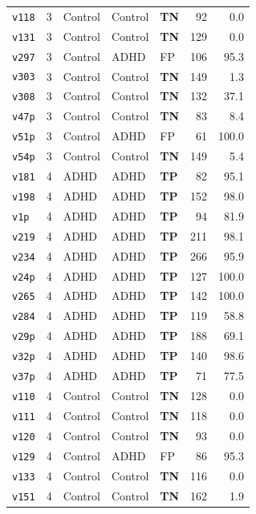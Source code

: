 \begin{longtable}{lclllrr}
  \texttt{v118} & 3 & Control & Control & \textbf{TN} & 92 & 0.0 \\
  \texttt{v131} & 3 & Control & Control & \textbf{TN} & 129 & 0.0 \\
  \texttt{v297} & 3 & Control & ADHD & FP & 106 & 95.3 \\
  \texttt{v303} & 3 & Control & Control & \textbf{TN} & 149 & 1.3 \\
  \texttt{v308} & 3 & Control & Control & \textbf{TN} & 132 & 37.1 \\
  \texttt{v47p} & 3 & Control & Control & \textbf{TN} & 83 & 8.4 \\
  \texttt{v51p} & 3 & Control & ADHD & FP & 61 & 100.0 \\
  \texttt{v54p} & 3 & Control & Control & \textbf{TN} & 149 & 5.4 \\
  \midrule
  \texttt{v181} & 4 & ADHD & ADHD & \textbf{TP} & 82 & 95.1 \\
  \texttt{v198} & 4 & ADHD & ADHD & \textbf{TP} & 152 & 98.0 \\
  \texttt{v1p} & 4 & ADHD & ADHD & \textbf{TP} & 94 & 81.9 \\
  \texttt{v219} & 4 & ADHD & ADHD & \textbf{TP} & 211 & 98.1 \\
  \texttt{v234} & 4 & ADHD & ADHD & \textbf{TP} & 266 & 95.9 \\
  \texttt{v24p} & 4 & ADHD & ADHD & \textbf{TP} & 127 & 100.0 \\
  \texttt{v265} & 4 & ADHD & ADHD & \textbf{TP} & 142 & 100.0 \\
  \texttt{v284} & 4 & ADHD & ADHD & \textbf{TP} & 119 & 58.8 \\
  \texttt{v29p} & 4 & ADHD & ADHD & \textbf{TP} & 188 & 69.1 \\
  \texttt{v32p} & 4 & ADHD & ADHD & \textbf{TP} & 140 & 98.6 \\
  \texttt{v37p} & 4 & ADHD & ADHD & \textbf{TP} & 71 & 77.5 \\
  \texttt{v110} & 4 & Control & Control & \textbf{TN} & 128 & 0.0 \\
  \texttt{v111} & 4 & Control & Control & \textbf{TN} & 118 & 0.0 \\
  \texttt{v120} & 4 & Control & Control & \textbf{TN} & 93 & 0.0 \\
  \texttt{v129} & 4 & Control & ADHD & FP & 86 & 95.3 \\
  \texttt{v133} & 4 & Control & Control & \textbf{TN} & 116 & 0.0 \\
  \texttt{v151} & 4 & Control & Control & \textbf{TN} & 162 & 1.9 \\

\end{longtable}
